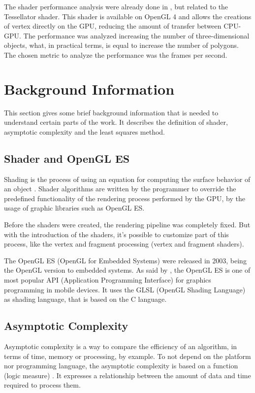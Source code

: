 \documentclass[10pt, conference, compsocconf]{IEEEtran}
\begin{document}
The shader performance analysis were already done in \cite{sbgames}, but related to the
Tessellator shader. This shader is available on OpenGL 4 and
allows the creations of vertex directly on the GPU, reducing the 
amount of transfer between CPU-GPU. The performance was analyzed increasing the number of three-dimensional
objects, what, in practical terms, is equal to increase the number of polygons. The chosen metric
to analyze the performance was the frames per second.

\section{Background Information}

This section gives some brief background information that is needed to
understand certain parts of the work. It describes the definition of shader,
asymptotic complexity and the least squares method.

\subsection{Shader and OpenGL ES}

Shading is the process of using an equation for computing the surface
behavior of an object \cite{realtime}. Shader algorithms are written by the programmer
to override the predefined functionality of the rendering process performed
by the GPU, by the usage of graphic libraries such as OpenGL ES.

Before the shaders were created, the rendering pipeline was completely fixed.
But with the introduction of the shaders, it's possible to customize part
of this process, like the vertex and fragment processing (vertex and fragment
shaders).

The OpenGL ES (OpenGL for Embedded Systems) were released in 2003, being the
OpenGL version to embedded systems. As said by \cite{guha2011}, the OpenGL ES
is one of most popular API (Application Programming Interface) for graphics 
programming in mobile devices. It uses the GLSL (OpenGL Shading Language) 
as shading language, that is based on the C language.

\subsection{Asymptotic Complexity }

Asymptotic complexity is a way to compare the efficiency of an algorithm,
in terms of time, memory or processing, by example. To not depend on the
platform nor programming language, the asymptotic complexity is based on
a function (logic measure) \cite{complexidade}. It expresses a relationship between the amount
of data and time required to process them. 
\end{document}
